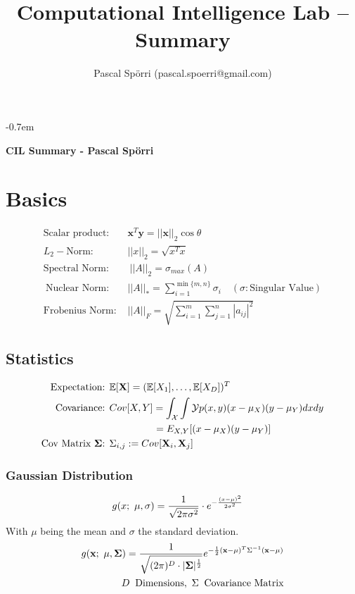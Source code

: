 \documentclass[a4paper,11pt,landscape]{article}
\title{Computational Intelligence Lab -- Summary}
\author{Pascal Spörri (pascal.spoerri@gmail.com)}
\newcommand{\sectionline}{\noindent\makebox[\linewidth]{\rule{\columnwidth}{0.1pt}}}
\begin{document}
\raggedright
\footnotesize
\setlength{\columnseprule}{0.1mm}
\abovedisplayskip=0pt
\belowdisplayskip=0cm
\allowdisplaybreaks
\itemsep-0.7em
 
\begin{multicols}{3}
\textbf{CIL Summary - Pascal Spörri}
\vspace{-2mm}
\sectionline
\section{Basics}
\begin{align*}
 \text{Scalar product: }&\mathbf x^T \mathbf y = ||\mathbf x||_2 \cos \theta\\
 L_2-\text{Norm: } & ||x||_2 = \sqrt{x^Tx}\\
 \text{Spectral Norm: } &\ ||A||_2 = \sigma_{max}(A)\\\
 \text{Nuclear Norm: }& ||A||_* = \sum_{i=1}^{\min\{m,n\}} \sigma_i\quad (\sigma: \text{Singular Value})\\
 \text{Frobenius Norm: }& ||A||_F = \sqrt{\sum_{i=1}^m \sum_{j=1}^n |a_{ij}|^2}
\end{align*}

\vspace{-3mm}
\subsection{Statistics}
\begin{align*}
 \text{Expectation: }&\mathbb E[\mathbf X] = (\mathbb E[X_1], \ldots, \mathbb E[X_D])^T\\
 \text{Covariance: } &Cov[X,Y] = \int_{\mathcal X}\int{\mathcal Y} p(x,y)(x - \mu_X)(y - \mu_Y) dxdy\\
 &\qquad \qquad \, \ = \mathbb \mathcal E_{X,Y}[(x-\mu_X)(y-\mu_Y)]\\
 \text{Cov Matrix $\mathbf \Sigma$: } & \Sigma_{i,j} := Cov[\mathbf X_i, \mathbf X_j]
\end{align*}

\subsubsection{Gaussian Distribution}
\vspace{-2mm}
\begin{align*}
 g(x;\ \mu,\sigma) &= {1\over \sqrt{2\pi \sigma^2}} \cdot e^{- {(x-\mu)^2 \over 2 \sigma^2}}
\end{align*}
With $\mu$ being the mean and $\sigma$ the standard deviation.
\begin{align*}
 g(\mathbf x;\ \mathbf \mu, \mathbf \Sigma) = {1\over \sqrt{(2\pi)^D \cdot |\mathbf \Sigma|^{1\over 2}}} e^{-\frac{1}{2} (\mathbf x - \mathbf \mu)^T  \Sigma^{-1}  (\mathbf x - \mathbf \mu)}\\
 D\:\ \text{Dimensions},\ \Sigma\:\ \text{Covariance Matrix}
\end{align*}

\end{multicols}
\end{document}
